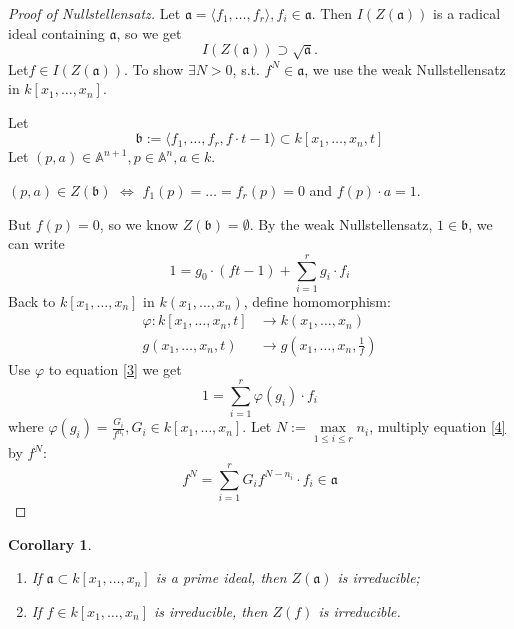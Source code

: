 \documentclass{amsart}
\theoremstyle{plain}
\newtheorem{corollary}{Corollary}
\theoremstyle{definition}
\theoremstyle{remark}
\numberwithin{equation}{section}
\begin{document}
  \begin{proof}[Proof of Nullstellensatz]
  	Let $ \mathfrak{a} = \langle f_1,\dots, f_r\rangle, f_i\in \mathfrak{a} $. Then $ I(Z(\mathfrak{a}))  $ is a radical ideal containing $ \mathfrak{a} $, so we get
  	$$
  	I(Z(\mathfrak{a}))\supset \sqrt{\mathfrak{a}}.
  	$$
  	Let$ f\in I(Z(\mathfrak{a})) $. To show $ \exists N>0 $, s.t. $ f^N\in \mathfrak{a} $, we use the weak Nullstellensatz in $ k[x_1,\dots,x_n] $.
  	
  	Let
  	\begin{equation}
  	\mathfrak{b}:=\langle f_1,\dots,f_r,f\cdot t -1\rangle\subset k[x_1,\dots,x_n,t]
  	\end{equation}
  	Let $ (p,a)\in \mathbb{A}^{n+1}, p\in \mathbb{A}^n, a\in k $.
  	\begin{center}
  		$ (p,a)\in Z(\mathfrak{b}) $ $ \Leftrightarrow $ $ f_1(p)=\dots=f_r(p)=0 $ and $ f(p)\cdot a=1 $.
  	\end{center}
  	But $ f(p)=0 $, so we know $ Z(\mathfrak{b})=\emptyset $. By the weak Nullstellensatz, $ 1\in \mathfrak{b} $, we can write
  	\begin{equation}
  	1=g_0\cdot (ft-1)+\sum\limits_{i=1}^{r}g_i\cdot f_i\label{3}
  	\end{equation}
  	Back to $ k[x_1,\dots,x_n] $ in $ k(x_1,\dots,x_n) $, define homomorphism:
  	$$
  	\begin{array}{cc}
  	\varphi: k[x_1,\dots,x_n,t] & \to k(x_1,\dots,x_n)\\
  	g(x_1,\dots,x_n,t) & \to g(x_1,\dots,x_n,\frac{1}{f})
  	\end{array}
  	$$
  	Use $ \varphi $ to equation \ref{3} we get
  	\begin{equation}
  	1=\sum\limits_{i=1}^{r}\varphi (g_i)\cdot f_i\label{4}
  	\end{equation}
  	where $ \varphi(g_i)=\frac{G_i}{f^{n_i}},G_i\in k[x_1,\dots,x_n] $. Let $ N:=\max\limits_{1\leq i\leq r}n_i $, multiply equation \ref{4} by $ f^N $:
  	\begin{equation}
  	f^N=\sum\limits_{i=1}^{r}G_if^{N-n_i}\cdot f_i\in \mathfrak{a}
  	\end{equation}
  \end{proof}
  \begin{corollary}
  	\begin{enumerate}
  		\item If $ \mathfrak{a}\subset k[x_1,\dots,x_n] $ is a prime ideal, then $ Z(\mathfrak{a}) $ is irreducible;
  		\item If $ f\in k[x_1,\dots,x_n] $ is irreducible, then $ Z(f) $ is irreducible.
  	\end{enumerate}
  \end{corollary}
\end{document}
